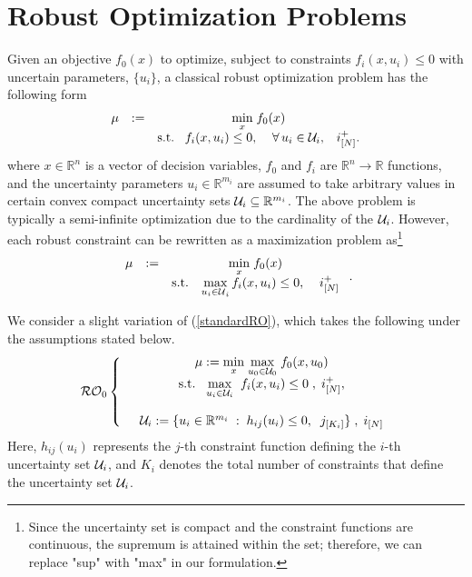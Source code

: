 \documentclass[journal,twoside,web]{ieeecolor}
\newcommand{\real}{\mathbb{R}}
\begin{document}
\section{Robust Optimization Problems}\label{sec_RO}
Given an objective $f_0(x)$ to optimize, subject to constraints $f_i(x,u_i) \leq 0$ with uncertain parameters, $\{u_i\}$, a classical robust optimization problem has the following form
$$
\begin{array}{ccc}
\mu&:=&\underset{x}{\min}\; f_0(x)\\
&&\text{s.t.}\;\;\;f_i(x,u_i)\leq 0,\;\;\;\; \forall \,u_i\in {\cal U}_i,\;\;\;i^+_{[N]}.
\end{array}
$$
where $x\in \real^n$ is a vector of decision variables, $f_0$ and $f_i$ are $\real^n \to \real$ functions, and the uncertainty parameters $u_i \in \real^{m_i}$ are assumed to take arbitrary values in certain convex compact uncertainty sets ${\cal U}_i \subseteq \real^{m_i}$.
The above problem is typically a semi-infinite optimization due to the cardinality of the ${\cal U}_i$. However, each robust constraint can be rewritten as a maximization problem as\footnote{{\color{blue}Since the uncertainty set is compact and the constraint functions are continuous, the supremum is attained within the set; therefore, we can replace "sup" with "max" in our formulation.}}
\begin{align}
\begin{array}{ccc}
\mu&:=&\underset{x}{\min}\; f_0(x)\\
&&\text{s.t.}\;\;\;\displaystyle\max_{{u_i\in \cal U}_i} f_i(x,u_i)\leq 0,\;\;\;\;i^+_{[N]}
\end{array}\;.\label{standardRO}
\end{align}

We consider a slight variation of (\ref{standardRO}), which takes the following under the assumptions stated below.
\begin{equation}\label{RO0}
\mathcal{RO}_0\left\{ \begin{array}{ccc}
&\mu:=\underset{x}{\min} \;\underset{u_0\in {\cal U}_0}{\max}\; f_0(x,u_0)\\
&\text{s.t.}\;\;\;\underset{u_i\in {\cal U}_i}{\max}\;\; f_i(x,u_i)\leq 0\;,\;i^+_{[N]},\\ \\
&{\cal U}_i:=\{u_ i\in \mathbb{R}^{m_i}\;:\;h_{ij}(u_i)\leq 0,\;\;j_{[K_i]}\}\;,\;i_{[N]}
\end{array}\right.
\end{equation}
{\color{blue} Here, $h_{ij}(u_i)$ represents the $j$-th constraint function defining the $i$-th uncertainty set ${\cal U}_i$, and $K_i$ denotes the total number of constraints that define the uncertainty set ${\cal U}_i$.} 
\end{document}
